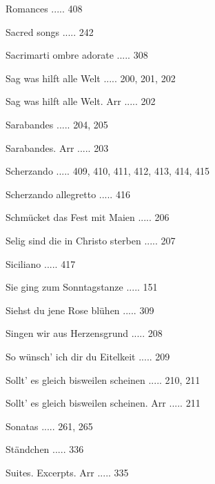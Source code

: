\documentclass[twocolumn]{book}
\begin{document}
\newline 
Romances ..... 408

\newline 
Sacred songs ..... 242

\newline 
Sacrimarti ombre adorate ..... 308

\newline 
Sag was hilft alle Welt ..... 200, 201, 202

\newline 
Sag was hilft alle Welt. Arr ..... 202

\newline 
Sarabandes ..... 204, 205

\newline 
Sarabandes. Arr ..... 203

\newline 
Scherzando ..... 409, 410, 411, 412, 413, 414, 415

\newline 
Scherzando allegretto ..... 416

\newline 
Schmücket das Fest mit Maien ..... 206

\newline 
Selig sind die in Christo sterben ..... 207

\newline 
Siciliano ..... 417

\newline 
Sie ging zum Sonntagstanze ..... 151

\newline 
Siehst du jene Rose blühen ..... 309

\newline 
Singen wir aus Herzensgrund ..... 208

\newline 
So wünsch' ich dir du Eitelkeit ..... 209

\newline 
Sollt' es gleich bisweilen scheinen ..... 210, 211

\newline 
Sollt' es gleich bisweilen scheinen. Arr ..... 211

\newline 
Sonatas ..... 261, 265

\newline 
Ständchen ..... 336

\newline 
Suites. Excerpts. Arr ..... 335
\end{document}
